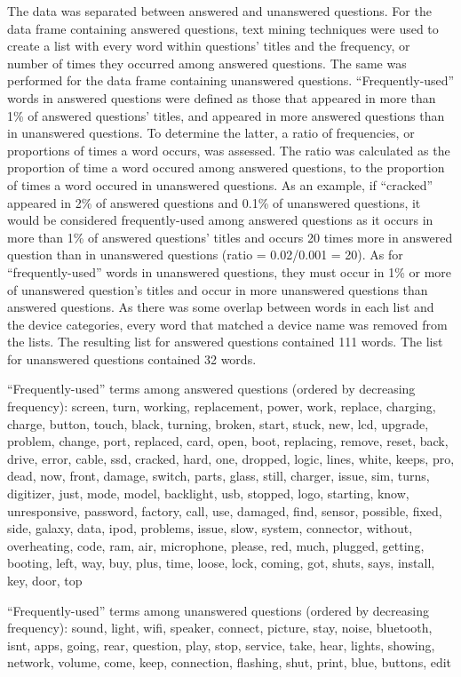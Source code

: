 \documentclass{article}
\begin{document}
The data was separated between answered and unanswered questions. For the data frame containing answered questions, text mining techniques were used to create a list with every word within questions' titles and the frequency, or number of times they occurred among answered questions. The same was performed for the data frame containing unanswered questions. ``Frequently-used'' words in answered questions were defined as those that appeared in more than 1\% of answered questions' titles, and appeared in more answered questions than in unanswered questions. To determine the latter, a ratio of frequencies, or proportions of times a word occurs, was assessed. The ratio was calculated as the proportion of time a word occured among answered questions, to the proportion of times a word occured in unanswered questions. As an example, if ``cracked'' appeared in 2\% of answered questions and 0.1\% of unanswered questions, it would be considered frequently-used among answered questions as it occurs in more than 1\% of answered questions' titles and occurs 20 times more in answered question than in unanswered questions (ratio = 0.02/0.001 = 20). As for ``frequently-used'' words in unanswered questions, they must occur in 1\% or more of unanswered question's titles and occur in more unanswered questions than answered questions. As there was some overlap between words in each list and the device categories, every word that matched a device name was removed from the lists. The resulting list for answered questions contained 111 words. The list for unanswered questions contained 32 words. 

  
``Frequently-used'' terms among answered questions (ordered by decreasing frequency): 
screen, turn, working, replacement, power, work, replace, charging, charge, button, touch, black, turning, broken, start, stuck, new, lcd, upgrade, problem, change, port, replaced, card, open, boot, replacing, remove, reset, back, drive, error, cable, ssd, cracked, hard, one, dropped, logic, lines, white, keeps, pro, dead, now, front, damage, switch, parts, glass, still, charger, issue, sim, turns, digitizer, just, mode, model, backlight, usb, stopped, logo, starting, know, unresponsive, password, factory, call, use, damaged, find, sensor, possible, fixed, side, galaxy, data, ipod, problems, issue, slow, system, connector, without, overheating, code, ram, air, microphone, please, red, much, plugged, getting, booting, left, way, buy, plus, time, loose, lock, coming, got, shuts, says, install, key, door, top

``Frequently-used'' terms among unanswered questions (ordered by decreasing frequency):
sound, light, wifi, speaker, connect, picture, stay, noise, bluetooth, isnt, apps, going, rear, question, play, stop, service, take, hear, lights, showing, network, volume, come, keep, connection, flashing, shut, print, blue, buttons, edit
\end{document}
